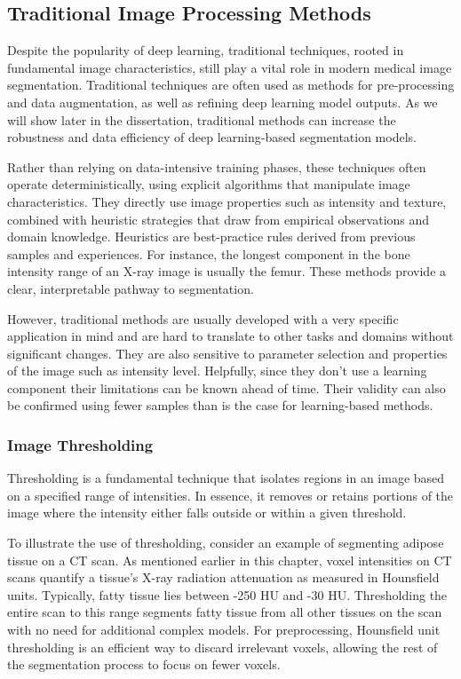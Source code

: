 \subsection{Traditional Image Processing Methods}

Despite the popularity of deep learning, traditional techniques, rooted in fundamental image characteristics, still play a vital role in modern medical image segmentation. Traditional techniques are often used as methods for pre-processing and data augmentation, as well as refining deep learning model outputs. As we will show later in the dissertation, traditional methods can increase the robustness and data efficiency of deep learning-based segmentation models.

Rather than relying on data-intensive training phases, these techniques often operate deterministically, using explicit algorithms that manipulate image characteristics. They directly use image properties such as intensity and texture, combined with heuristic strategies that draw from empirical observations and domain knowledge. Heuristics are best-practice rules derived from previous samples and experiences. For instance, the longest component in the bone intensity range of an X-ray image is usually the femur. These methods provide a clear, interpretable pathway to segmentation.

However, traditional methods are usually developed with a very specific application in mind and are hard to translate to other tasks and domains without significant changes. They are also sensitive to parameter selection and properties of the image such as intensity level. Helpfully, since they don't use a learning component their limitations can be known ahead of time. Their validity can also be confirmed using fewer samples than is the case for learning-based methods.

\subsubsection{Image Thresholding}

Thresholding is a fundamental technique that isolates regions in an image based on a specified range of intensities. In essence, it removes or retains portions of the image where the intensity either falls outside or within a given threshold.

To illustrate the use of thresholding, consider an example of segmenting adipose tissue on a CT scan. As mentioned earlier in this chapter, voxel intensities on CT scans quantify a tissue's X-ray radiation attenuation as measured in Hounsfield units. Typically, fatty tissue lies between -250 HU and -30 HU. Thresholding the entire scan to this range segments fatty tissue from all other tissues on the scan with no need for additional complex models. For preprocessing, Hounsfield unit thresholding is an efficient way to discard irrelevant voxels, allowing the rest of the segmentation process to focus on fewer voxels.

